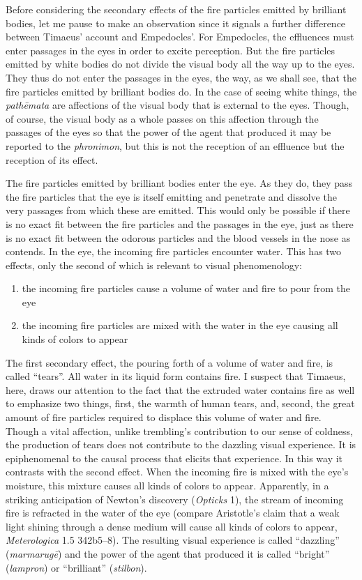 Before considering the secondary effects of the fire particles emitted by brilliant bodies, let me pause to make an observation since it signals a further difference between Timaeus' account and Empedocles'. For Empedocles, the effluences must enter passages in the eyes in order to excite perception. But the fire particles emitted by white bodies do not divide the visual body all the way up to the eyes. They thus do not enter the passages in the eyes, the way, as we shall see, that the fire particles emitted by brilliant bodies do. In the case of seeing white things, the \emph{pathēmata} are affections of the visual body that is external to the eyes. Though, of course, the visual body as a whole passes on this affection through the passages of the eyes so that the power of the agent that produced it may be reported to the \emph{phronimon}, but this is not the reception of an effluence but the reception of its effect. 

The fire particles emitted by brilliant bodies enter the eye. As they do, they pass the fire particles that the eye is itself emitting and penetrate and dissolve the very passages from which these are emitted. This would only be possible if there is no exact fit between the fire particles and the passages in the eye, just as there is no exact fit between the odorous particles and the blood vessels in the nose as \citet{Vlastos:1967jw} contends. In the eye, the incoming fire particles encounter water. This has two effects, only the second of which is relevant to visual phenomenology:
\begin{enumerate}[(1)]
	\item the incoming fire particles cause a volume of water and fire to pour from the eye
	\item the incoming fire particles are mixed with the water in the eye causing all kinds of colors to appear
\end{enumerate}
The first secondary effect, the pouring forth of a volume of water and fire, is called ``tears''. All water in its liquid form contains fire. I suspect that Timaeus, here, draws our attention to the fact that the extruded water contains fire as well to emphasize two things, first, the warmth of human tears, and, second, the great amount of fire particles required to displace this volume of water and fire. Though a vital affection, unlike trembling's contribution to our sense of coldness, the production of tears does not contribute to the dazzling visual experience. It is epiphenomenal to the causal process that elicits that experience. In this way it contrasts with the second effect. When the incoming fire is mixed with the eye's moisture, this mixture causes all kinds of colors to appear. Apparently, in a striking anticipation of Newton's discovery (\emph{Opticks} 1), the stream of incoming fire is refracted in the water of the eye (compare Aristotle's claim that a weak light shining through a dense medium will cause all kinds of colors to appear, \emph{Meterologica} 1.5 342b5--8). The resulting visual experience is called ``dazzling'' (\emph{marmarugē}) and the power of the agent that produced it is called ``bright''  (\emph{lampron}) or ``brilliant'' (\emph{stilbon}).


